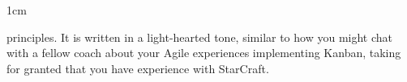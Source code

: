 \begin{setlength}{\leftmargin}{1cm}
\begin{description}
principles. It is written in a light-hearted tone, similar to how you might chat with a fellow coach about your Agile experiences implementing Kanban, taking for granted that you have experience with StarCraft.

\end{description}
\end{setlength}